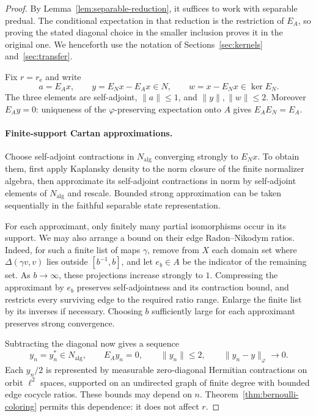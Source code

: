 \begin{proof}
By Lemma~\ref{lem:separable-reduction}, it suffices to work with separable predual. The conditional expectation in that reduction is the restriction of $E_A$, so proving the stated diagonal choice in the smaller inclusion proves it in the original one. We henceforth use the notation of Sections~\ref{sec:kernels} and~\ref{sec:transfer}.

Fix $r=r_{\mathrm e}$ and write
\[
 a=E_Ax,\qquad y=E_Nx-E_Ax\in N,
 \qquad w=x-E_Nx\in\ker E_N.
\]
The three elements are self-adjoint, $\|a\|\le1$, and $\|y\|,\|w\|\le2$. Moreover $E_Ay=0$: uniqueness of the $\varphi$-preserving expectation onto $A$ gives $E_AE_N=E_A$.

\paragraph{Finite-support Cartan approximations.}
Choose self-adjoint contractions in $N_{\mathrm{alg}}$ converging strongly to $E_Nx$. To obtain them, first apply Kaplansky density to the norm closure of the finite normalizer algebra, then approximate its self-adjoint contractions in norm by self-adjoint elements of $N_{\mathrm{alg}}$ and rescale. Bounded strong approximation can be taken sequentially in the faithful separable state representation.

For each approximant, only finitely many partial isomorphisms occur in its support. We may also arrange a bound on their edge Radon--Nikodym ratios. Indeed, for such a finite list of maps $\gamma$, remove from $X$ each domain set where $\Delta(\gamma v,v)$ lies outside $[b^{-1},b]$, and let $e_b\in A$ be the indicator of the remaining set. As $b\to\infty$, these projections increase strongly to $1$. Compressing the approximant by $e_b$ preserves self-adjointness and its contraction bound, and restricts every surviving edge to the required ratio range. Enlarge the finite list by its inverses if necessary. Choosing $b$ sufficiently large for each approximant preserves strong convergence.

Subtracting the diagonal now gives a sequence
\begin{equation}\label{eq:cartan-approximants}
 y_n=y_n^*\in N_{\mathrm{alg}},\qquad E_Ay_n=0,
 \qquad \|y_n\|\le2,\qquad \|y_n-y\|_\varphi\longrightarrow0.
\end{equation}
Each $y_n/2$ is represented by measurable zero-diagonal Hermitian contractions on orbit $\ell^2$ spaces, supported on an undirected graph of finite degree with bounded edge cocycle ratios. These bounds may depend on $n$. Theorem~\ref{thm:bernoulli-coloring} permits this dependence: it does not affect $r$.


\end{proof}
